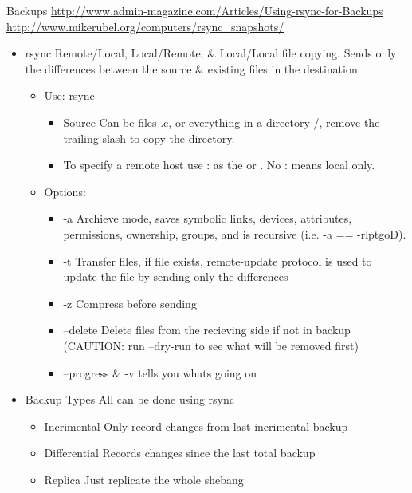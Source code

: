 \documentclass{notes}
\begin{document}
\begin{questions}{Backups}
	 \url{http://www.admin-magazine.com/Articles/Using-rsync-for-Backups}\\
	 \url{http://www.mikerubel.org/computers/rsync_snapshots/}\\
	\begin{itemize}
		\item rsync \ra Remote/Local, Local/Remote, \& Local/Local file copying. Sends only the differences between the source \& existing files in the destination
			\begin{itemize}
				\item Use: rsync   
					\begin{itemize}
						\item Source \ra Can be files \ra *.c, or everything in a directory /, remove the trailing slash to copy the directory.
						\item To specify a remote host \opt{computer name} use \ra {}: as the  or . No : means local only.
					\end{itemize}
				\item Options:
					\begin{itemize}
						\item -a \ra Archieve mode, saves symbolic links, devices, attributes, permissions, ownership, groups, and is recursive (i.e. -a == -rlptgoD).
						\item -t \ra Transfer files, if file exists, remote-update protocol is used to update the file by sending only the differences
						\item -z \ra Compress before sending
						\item --delete \ra Delete files from the recieving side if not in backup (CAUTION: run --dry-run to see what will be removed first)
						\item --progress \& -v tells you whats going on
					\end{itemize}
			\end{itemize}
		\item Backup Types \ra All can be done using rsync
			\begin{itemize}
				\item Incrimental \ra Only record changes from last incrimental backup
				\item Differential \ra Records changes since the last total backup
				\item Replica \ra Just replicate the whole shebang

\end{itemize}
\end{itemize}
\end{questions}
\end{document}
